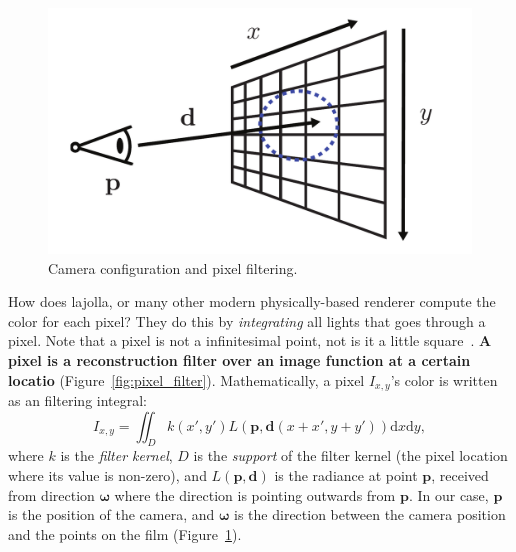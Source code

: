 \documentclass{article}
\begin{document}
\begin{figure}[h]
    \centering
    \includegraphics[width=0.4\linewidth]{imgs/camera.pdf}
    \caption{Camera configuration and pixel filtering.}
    \label{fig:camera}
\end{figure}

How does lajolla, or many other modern physically-based renderer compute the color for each pixel? They do this by \emph{integrating} all lights that goes through a pixel. Note that a pixel is not a infinitesimal point, not is it a little square~\cite{Smith:1995:PLS}. \textbf{A pixel is a reconstruction filter over an image function at a certain locatio} (Figure~\ref{fig:pixel_filter}). Mathematically, a pixel $I_{x, y}$'s color is written as an filtering integral:
\begin{equation}
    I_{x, y} = \iint_{D} k(x', y') L(\mathbf{p}, \mathbf{d}(x + x', y + y')) \mathrm{d}x\mathrm{d}y,
    \label{eq:pixel_filter}
\end{equation}
where $k$ is the \emph{filter kernel}, $D$ is the \emph{support} of the filter kernel (the pixel location where its value is non-zero), and $L(\mathbf{p}, \mathbf{d})$ is the radiance at point $\mathbf{p}$, received from direction $\mathbf{\omega}$ where the direction is pointing outwards from $\mathbf{p}$. In our case, $\mathbf{p}$ is the position of the camera, and $\mathbf{\omega}$ is the direction between the camera position and the points on the film (Figure~\ref{fig:camera}).
\end{document}
